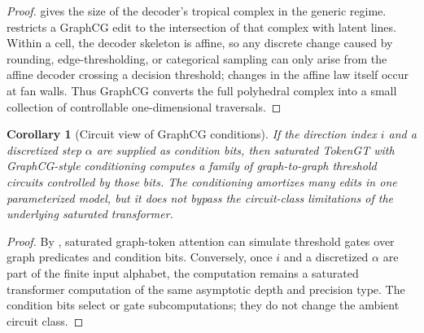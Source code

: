 \documentclass[11pt]{article}
\newtheorem{corollary}[theorem]{Corollary}
\begin{document}
\begin{proof}
 gives the size of the decoder's tropical complex in the generic regime.   restricts a GraphCG edit to the intersection of that complex with latent lines.  Within a cell, the decoder skeleton is affine, so any discrete change caused by rounding, edge-thresholding, or categorical sampling can only arise from the affine decoder crossing a decision threshold; changes in the affine law itself occur at fan walls.  Thus GraphCG converts the full polyhedral complex into a small collection of controllable one-dimensional traversals.
\end{proof}

\begin{corollary}[Circuit view of GraphCG conditions]
\label{cor:graphcg-circuit}
If the direction index $i$ and a discretized step $\alpha$ are supplied as condition bits, then saturated TokenGT with GraphCG-style conditioning computes a family of graph-to-graph threshold circuits controlled by those bits.  The conditioning amortizes many edits in one parameterized model, but it does not bypass the circuit-class limitations of the underlying saturated transformer.
\end{corollary}

\begin{proof}
By , saturated graph-token attention can simulate threshold gates over graph predicates and condition bits.  Conversely, once $i$ and a discretized $\alpha$ are part of the finite input alphabet, the computation remains a saturated transformer computation of the same asymptotic depth and precision type.  The condition bits select or gate subcomputations; they do not change the ambient circuit class.
\end{proof}
\end{document}
